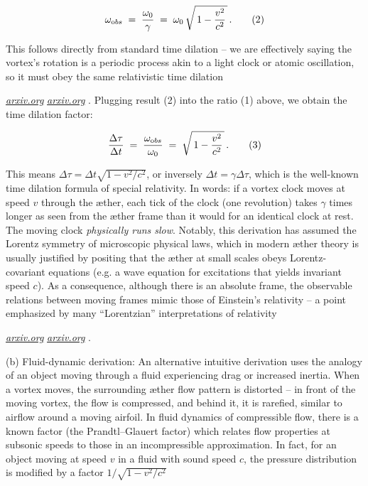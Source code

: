 \documentclass[aps,preprint,superscriptaddress]{revtex4}
\begin{document}
 \begin{equation}
\omega_{\textrm obs} \;=\; \frac{\omega_0}{\gamma} \;=\; \omega_0\,\sqrt{\,1-\frac{v^2}{c^2}\,}\,. \tag{2}
 \end{equation}

This follows directly from standard time dilation – we are effectively saying the vortex’s rotation is a periodic process akin to a light clock or atomic oscillation, so it must obey the same relativistic time dilation

\href{https://arxiv.org/pdf/physics/0611077#:~:text=This%20formula%20has%20the%20same,2%29%20of}{\textit{arxiv.org}}
\href{https://arxiv.org/pdf/physics/0611077#:~:text=relativity%20theory%2C%20but%20obviously%20its,light%20in%20all%20inertial%20frames}{\textit{arxiv.org}}
. Plugging result (2) into the ratio (1) above, we obtain the time dilation factor:

 \begin{equation}
\frac{\Delta \tau}{\Delta t} \;=\; \frac{\omega_{\textrm obs}}{\omega_0} \;=\; \sqrt{\,1-\frac{v^2}{c^2}\,}\,. \tag{3}
 \end{equation}

This means $\Delta \tau = \Delta t \sqrt{1-v^2/c^2}$, or inversely $\Delta t = \gamma \Delta \tau$, which is the well-known time dilation formula of special relativity. In words: if a vortex clock moves at speed $v$ through the æther, each tick of the clock (one revolution) takes $\gamma$ times longer as seen from the æther frame than it would for an identical clock at rest. The moving clock \textit{physically runs slow}. Notably, this derivation has assumed the Lorentz symmetry of microscopic physical laws, which in modern æther theory is usually justified by positing that the æther at small scales obeys Lorentz-covariant equations (e.g. a wave equation for excitations that yields invariant speed $c$). As a consequence, although there is an absolute frame, the observable relations between moving frames mimic those of Einstein’s relativity – a point emphasized by many “Lorentzian” interpretations of relativity

\href{https://arxiv.org/pdf/physics/0611077#:~:text=relativity%20theory%2C%20but%20obviously%20its,light%20in%20all%20inertial%20frames}{\textit{arxiv.org}}
\href{https://arxiv.org/pdf/physics/0611077#:~:text=We%20should%20note%20that%2C%20when,a%20state%20of%20absolute%20rest}{\textit{arxiv.org}}
.

(b) Fluid-dynamic derivation: An alternative intuitive derivation uses the analogy of an object moving through a fluid experiencing drag or increased inertia. When a vortex moves, the surrounding æther flow pattern is distorted – in front of the moving vortex, the flow is compressed, and behind it, it is rarefied, similar to airflow around a moving airfoil. In fluid dynamics of compressible flow, there is a known factor (the Prandtl–Glauert factor) which relates flow properties at subsonic speeds to those in an incompressible approximation. In fact, for an object moving at speed $v$ in a fluid with sound speed $c$, the pressure distribution is modified by a factor $1/\sqrt{1-v^2/c^2}$
\end{document}
